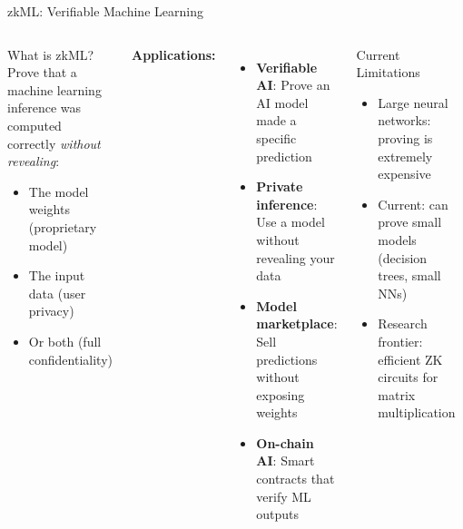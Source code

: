 \documentclass[8pt,aspectratio=169]{beamer}
\begin{document}
\begin{frame}{zkML: Verifiable Machine Learning}
\begin{columns}[T]
\begin{block}{\footnotesize What is zkML?}
\footnotesize
Prove that a machine learning inference was computed correctly \emph{without revealing}:
\begin{itemize}
\item The model weights (proprietary model)
\item The input data (user privacy)
\item Or both (full confidentiality)
\end{itemize}
\end{block}
\vspace{0.1cm}
\footnotesize
\textbf{Applications:}
\begin{itemize}
\item \textbf{Verifiable AI}: Prove an AI model made a specific prediction
\item \textbf{Private inference}: Use a model without revealing your data
\item \textbf{Model marketplace}: Sell predictions without exposing weights
\item \textbf{On-chain AI}: Smart contracts that verify ML outputs
\end{itemize}
\vspace{0.1cm}
\begin{alertblock}{\footnotesize Current Limitations}
\footnotesize
\begin{itemize}
\item Large neural networks: proving is extremely expensive
\item Current: can prove small models (decision trees, small NNs)
\item Research frontier: efficient ZK circuits for matrix multiplication
\end{itemize}
\end{alertblock}
\begin{center}
\end{center}
\end{columns}
\end{frame}
\end{document}
